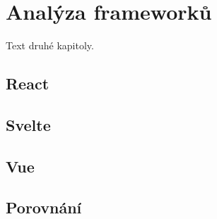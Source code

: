 \section{Analýza frameworků}

Text druhé kapitoly.

\subsection{React}

\subsection{Svelte}

\subsection{Vue}

\subsection{Porovnání}
